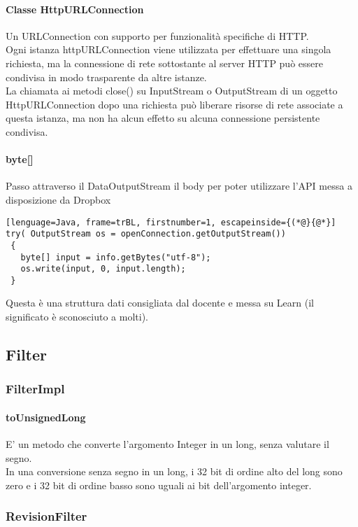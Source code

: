 \documentclass{article}
\begin{document}
\paragraph{Classe HttpURLConnection}
Un URLConnection con supporto per funzionalità specifiche di HTTP.\\
Ogni istanza httpURLConnection viene utilizzata per effettuare una singola richiesta, ma la connessione di rete sottostante al server HTTP può essere condivisa in modo trasparente da altre istanze. \\
La chiamata ai metodi close() su InputStream o OutputStream di un oggetto HttpURLConnection dopo una richiesta può liberare risorse di rete associate a questa istanza, ma non ha alcun effetto su alcuna connessione persistente condivisa. 
\paragraph{byte[]}
Passo attraverso il DataOutputStream il body per poter utilizzare l'API messa a disposizione da Dropbox
\begin{lstlisting}[lenguage=Java, frame=trBL, firstnumber=1, escapeinside={(*@}{@*}]
try( OutputStream os = openConnection.getOutputStream())
 {
   byte[] input = info.getBytes("utf-8");
   os.write(input, 0, input.length);
 }
\end{lstlisting}
Questa è una struttura dati consigliata dal docente e messa su Learn (il significato è sconosciuto a molti).
\subsection{Filter}
\subsubsection{FilterImpl}
\paragraph{toUnsignedLong}
E' un metodo che converte l'argomento Integer in un long, senza valutare il segno. \\
In una conversione senza segno in un long, i 32 bit di ordine alto del long sono zero e i 32 bit di ordine basso sono uguali ai bit dell'argomento integer.
\subsubsection{RevisionFilter}
\end{document}
